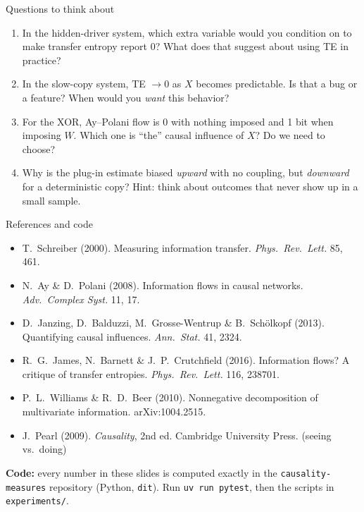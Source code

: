 \documentclass[aspectratio=169,11pt,xcolor={table}]{beamer}
\newcommand{\aside}[1]{{\color{muted}\small #1}}
\begin{document}
\begin{frame}{Questions to think about}
  \begin{enumerate}
    \setlength{\itemsep}{3mm}
    \item In the hidden-driver system, which extra variable would you condition on to make
      transfer entropy report 0? What does that suggest about using TE in practice?
    \item In the slow-copy system, TE $\to 0$ as $X$ becomes predictable.
      Is that a bug or a feature? When would you \emph{want} this behavior?
    \item For the XOR, Ay--Polani flow is 0 with nothing imposed and 1 bit when imposing $W$.
      Which one is ``the'' causal influence of $X$? Do we need to choose?
    \item Why is the plug-in estimate biased \emph{upward} with no coupling, but \emph{downward}
      for a deterministic copy? \aside{Hint: think about outcomes that never show up in a small sample.}
  \end{enumerate}
\end{frame}

\begin{frame}{References and code}
  \small
  \begin{itemize}
    \setlength{\itemsep}{1.5mm}
    \item T.\ Schreiber (2000). Measuring information transfer. \emph{Phys.\ Rev.\ Lett.} 85, 461.
    \item N.\ Ay \& D.\ Polani (2008). Information flows in causal networks. \emph{Adv.\ Complex Syst.} 11, 17.
    \item D.\ Janzing, D.\ Balduzzi, M.\ Grosse-Wentrup \& B.\ Sch\"olkopf (2013).
      Quantifying causal influences. \emph{Ann.\ Stat.} 41, 2324.
    \item R.\ G.\ James, N.\ Barnett \& J.\ P.\ Crutchfield (2016).
      Information flows? A critique of transfer entropies. \emph{Phys.\ Rev.\ Lett.} 116, 238701.
    \item P.\ L.\ Williams \& R.\ D.\ Beer (2010). Nonnegative decomposition of multivariate information. arXiv:1004.2515.
    \item J.\ Pearl (2009). \emph{Causality}, 2nd ed. Cambridge University Press. \aside{(seeing vs.\ doing)}
  \end{itemize}
  \bigskip
  \textbf{Code:} every number in these slides is computed exactly in the \texttt{causality-measures}
  repository (Python, \texttt{dit}). Run \texttt{uv run pytest}, then the scripts in \texttt{experiments/}.
\end{frame}
\end{document}
